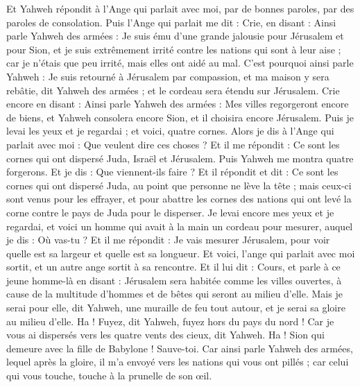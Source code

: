 \begin{multicols}{2}
Et Yahweh répondit à l'Ange qui parlait avec moi, par de bonnes paroles, par des paroles de consolation.
Puis l'Ange qui parlait me dit : Crie, en disant : Ainsi parle Yahweh des armées : Je suis ému d'une grande jalousie pour Jérusalem et pour Sion,
et je suis extrêmement irrité contre les nations qui sont à leur aise ; car je n'étais que peu irrité, mais elles ont aidé au mal.
C'est pourquoi ainsi parle Yahweh : Je suis retourné à Jérusalem par compassion, et ma maison y sera rebâtie, dit Yahweh des armées ; et le cordeau sera étendu sur Jérusalem.
Crie encore en disant : Ainsi parle Yahweh des armées : Mes villes regorgeront encore de biens, et Yahweh consolera encore Sion, et il choisira encore Jérusalem.
Puis je levai les yeux et je regardai ; et voici, quatre cornes.
Alors je dis à l'Ange qui parlait avec moi : Que veulent dire ces choses ? Et il me répondit : Ce sont les cornes qui ont dispersé Juda, Israël et Jérusalem.
Puis Yahweh me montra quatre forgerons.
Et je dis : Que viennent-ils faire ? Et il répondit et dit : Ce sont les cornes qui ont dispersé Juda, au point que personne ne lève la tête ; mais ceux-ci sont venus pour les effrayer, et pour abattre les cornes des nations qui ont levé la corne contre le pays de Juda pour le disperser.
\VerseOne{}Je levai encore mes yeux et je regardai, et voici un homme qui avait à la main un cordeau pour mesurer,
auquel je dis : Où vas-tu ? Et il me répondit : Je vais mesurer Jérusalem, pour voir quelle est sa largeur et quelle est sa longueur.
Et voici, l'ange qui parlait avec moi sortit, et un autre ange sortit à sa rencontre.
Et il lui dit : Cours, et parle à ce jeune homme-là en disant : Jérusalem sera habitée comme les villes ouvertes, à cause de la multitude d'hommes et de bêtes qui seront au milieu d'elle.
Mais je serai pour elle, dit Yahweh, une muraille de feu tout autour, et je serai sa gloire au milieu d'elle.
Ha ! Fuyez, dit Yahweh, fuyez hors du pays du nord ! Car je vous ai dispersés vers les quatre vents des cieux, dit Yahweh.
Ha ! Sion qui demeure avec la fille de Babylone ! Sauve-toi.
Car ainsi parle Yahweh des armées, lequel après la gloire, il m'a envoyé vers les nations qui vous ont pillés ; car celui qui vous touche, touche à la prunelle de son œil.

\end{multicols}
